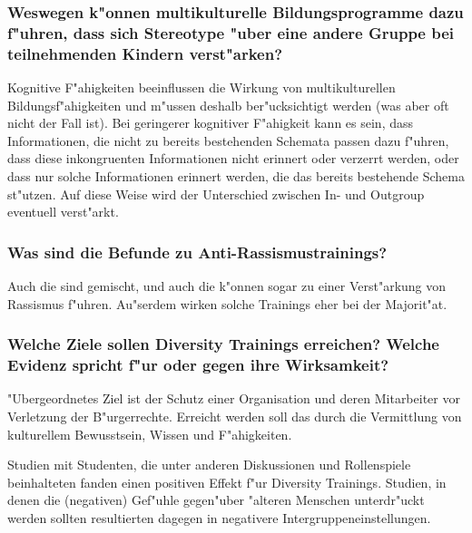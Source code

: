 \subsubsection{Weswegen k"onnen multikulturelle Bildungsprogramme dazu f"uhren, dass sich Stereotype "uber eine andere Gruppe bei teilnehmenden Kindern verst"arken?}
Kognitive F"ahigkeiten beeinflussen die Wirkung von multikulturellen Bildungsf"ahigkeiten und m"ussen deshalb ber"ucksichtigt werden (was aber oft nicht der Fall ist). Bei geringerer kognitiver F"ahigkeit kann es sein, dass Informationen, die nicht zu bereits bestehenden Schemata passen dazu f"uhren, dass diese inkongruenten Informationen nicht erinnert oder verzerrt werden, oder dass nur solche Informationen erinnert werden, die das bereits bestehende Schema st"utzen. Auf diese Weise wird der Unterschied zwischen In- und Outgroup eventuell verst"arkt.

\subsubsection{Was sind die Befunde zu Anti-Rassismustrainings?}
Auch die sind gemischt, und auch die k"onnen sogar zu einer Verst"arkung von Rassismus f"uhren. Au"serdem wirken solche Trainings eher bei der Majorit"at.

\subsubsection{Welche Ziele sollen Diversity Trainings erreichen? Welche Evidenz spricht f"ur oder gegen ihre Wirksamkeit?}
"Ubergeordnetes Ziel ist der Schutz einer Organisation und deren Mitarbeiter vor Verletzung der B"urgerrechte. Erreicht werden soll das durch die Vermittlung von kulturellem Bewusstsein, Wissen und F"ahigkeiten.

Studien mit Studenten, die unter anderen Diskussionen und Rollenspiele beinhalteten fanden einen positiven Effekt f"ur Diversity Trainings. Studien, in denen die (negativen) Gef"uhle gegen"uber "alteren Menschen unterdr"uckt werden sollten resultierten dagegen in negativere Intergruppeneinstellungen.
